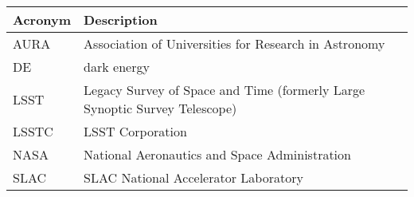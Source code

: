 \addtocounter{table}{-1}
\begin{longtable}{p{}p{}}\hline
\textbf{Acronym} & \textbf{Description}  \\\hline

AURA & Association of Universities for Research in Astronomy \\\hline
DE & dark energy \\\hline
LSST & Legacy Survey of Space and Time (formerly Large Synoptic Survey Telescope) \\\hline
LSSTC & LSST Corporation \\\hline
NASA & National Aeronautics and Space Administration \\\hline
SLAC & SLAC National Accelerator Laboratory \\\hline
\end{longtable}
